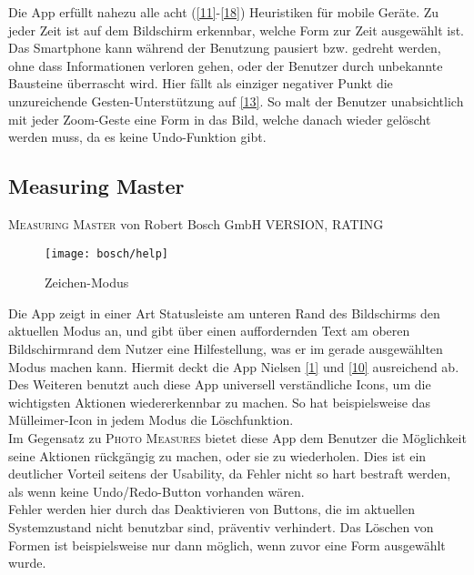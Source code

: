 Die App erfüllt nahezu alle acht (\ref{11}-\ref{18}) Heuristiken für mobile Geräte. Zu jeder Zeit ist auf dem Bildschirm erkennbar, welche Form zur Zeit ausgewählt ist. Das Smartphone kann während der Benutzung pausiert bzw. gedreht werden, ohne dass Informationen verloren gehen, oder der Benutzer durch unbekannte Bausteine überrascht wird.  Hier fällt als einziger negativer Punkt die unzureichende Gesten-Unterstützung auf \ref{13}. So malt der Benutzer unabsichtlich mit jeder Zoom-Geste eine Form in das Bild, welche danach wieder gelöscht werden muss, da es keine Undo-Funktion gibt. \\

\subsection{Measuring Master}

\textsc{Measuring Master} von Robert Bosch GmbH VERSION, RATING \\

\begin{wrapfigure}{R}{0.4\textwidth}
	\centering
	\texttt{[image: bosch/help]}
	\caption{Zeichen-Modus}	
	\label{fig:bhelp}
\end{wrapfigure}

Die App zeigt in einer Art Statusleiste am unteren Rand des Bildschirms den aktuellen Modus an, und gibt über einen auffordernden Text am oberen Bildschirmrand dem Nutzer eine Hilfestellung, was er im gerade ausgewählten Modus machen kann.  Hiermit deckt die App Nielsen \ref{1} und \ref{10} ausreichend ab. \\

Des Weiteren benutzt auch diese App universell verständliche Icons, um die wichtigsten Aktionen wiedererkennbar zu machen. So hat beispielsweise das Mülleimer-Icon in jedem Modus die Löschfunktion. \\

Im Gegensatz zu \textsc{Photo Measures} bietet diese App dem Benutzer die Möglichkeit seine Aktionen rückgängig zu machen, oder sie zu wiederholen. Dies ist ein deutlicher Vorteil seitens der Usability, da Fehler nicht so hart bestraft werden, als wenn keine Undo/Redo-Button vorhanden wären. \\

Fehler werden hier durch das Deaktivieren von Buttons, die im aktuellen Systemzustand nicht benutzbar sind, präventiv verhindert. Das Löschen von Formen ist beispielsweise nur dann möglich, wenn zuvor eine Form ausgewählt wurde.

